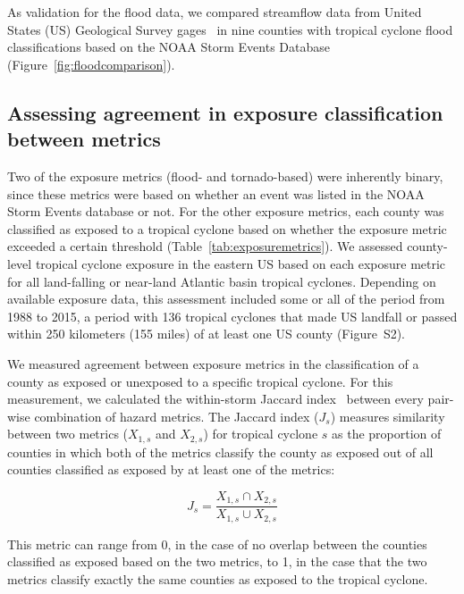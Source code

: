 As validation for the flood data, we compared streamflow data from United States (\ac{US})
Geological Survey gages~\citep{usgsgages, countyfloods, dataRetrieval} in nine counties with
tropical cyclone flood classifications based on the NOAA Storm Events Database 
(Figure~\ref{fig:floodcomparison}).

\subsection*{Assessing agreement in exposure classification between
metrics}

Two of the exposure metrics (flood- and tornado-based) were inherently binary,
since these metrics were based on whether an event was listed in the NOAA Storm
Events database or not.  For the other exposure metrics, each county was
classified as exposed to a tropical cyclone based on whether the exposure
metric exceeded a certain threshold (Table~\ref{tab:exposuremetrics}). We
assessed county-level tropical cyclone exposure in the eastern \ac{US} based on
each exposure metric for all land-falling or near-land Atlantic basin tropical
cyclones. Depending on available exposure data, this assessment included some
or all of the period from 1988 to 2015, a period with 136 tropical cyclones
that made \ac{US} landfall or passed within 250 kilometers (155 miles) of at least
one \ac{US} county (Figure~S2).

We measured agreement between exposure metrics in the classification of a
county as exposed or unexposed to a specific tropical cyclone. For this
measurement, we calculated the within-storm Jaccard 
index~\citep{jaccard1901distribution, jaccard1908nouvelles} between every pair-wise
combination of hazard metrics.  The Jaccard index ($J_s$) measures similarity
between two metrics ($X_{1,s}$ and $X_{2,s}$) for tropical cyclone $s$ as the
proportion of counties in which both of the metrics classify the county as
exposed out of all counties classified as exposed by at least one of the
metrics:

\begin{equation} 
J_s = \frac{X_{1,s} \cap X_{2,s}}{X_{1,s} \cup X_{2,s}}
\end{equation}

\noindent This metric can range from 0, in the case of no overlap between the counties
classified as exposed based on the two metrics, to 1, in the case that the
two metrics classify exactly the same counties as exposed to the tropical cyclone.
